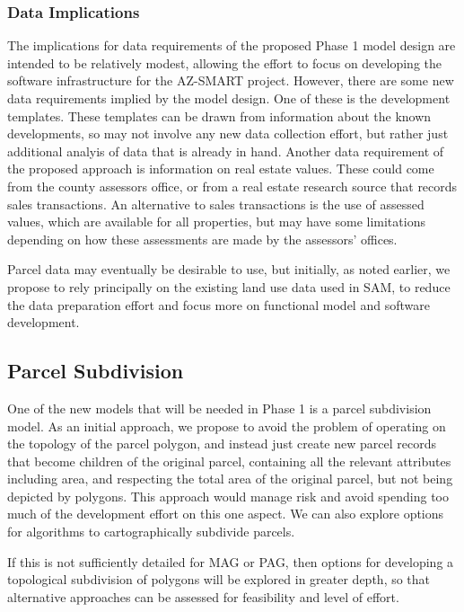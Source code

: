\subsubsection{Data Implications}
The implications for data requirements of the proposed Phase 1 model design are intended to be relatively
modest, allowing the effort to focus on developing the software infrastructure for the AZ-SMART project.  However,
there are some new data requirements implied by the model design.  One of these is the development templates.
These templates can be drawn from information about the known developments, so may not involve any new
data collection effort, but rather just additional analyis of data that is already in hand.  Another data requirement
of the proposed approach is information on real estate values.  These could come from the county assessors
office, or from a real estate research source that records sales transactions.  An alternative to sales transactions 
is the use of assessed values, which are available for all properties, but may have some limitations depending on
how these assessments are made by the assessors' offices.

Parcel data may eventually be desirable to use, but initially, as noted earlier, we propose to rely principally on the
existing land use data used in SAM, to reduce the data preparation effort and focus more on functional model and
software development.

\subsection{Parcel Subdivision}
One of the new models that will be needed in Phase 1 is a parcel
subdivision model.  As an initial approach, we propose to avoid the
problem of operating on the topology of the parcel polygon, and
instead just create new parcel records that become children of the
original parcel, containing all the relevant attributes including
area, and respecting the total area of the original parcel, but not
being depicted by polygons.  This approach would manage risk and
avoid spending too much of the development effort on this one
aspect.  We can also explore options for algorithms to
cartographically subdivide parcels.

If this is not sufficiently detailed for MAG or PAG, then options for developing a topological subdivision of polygons
will be explored in greater depth, so that alternative approaches can be assessed for feasibility and level of effort.

